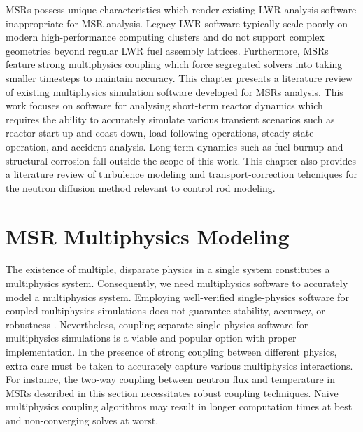 \glspl{MSR} possess unique characteristics which render existing \gls{LWR}
analysis software inappropriate for \gls{MSR} analysis. Legacy \gls{LWR}
software typically scale poorly on modern high-performance computing
clusters and do not support complex geometries beyond regular \gls{LWR} fuel
assembly lattices. Furthermore, \glspl{MSR} feature strong multiphysics
coupling which force segregated solvers into taking smaller timesteps to
maintain accuracy. This chapter presents a literature
review of existing multiphysics simulation software developed for \glspl{MSR}
analysis. This work focuses on software for analysing short-term reactor
dynamics which requires the ability to accurately simulate various transient
scenarios such as reactor start-up and coast-down, load-following operations,
steady-state operation, and accident analysis. Long-term dynamics such as fuel
burnup and structural corrosion fall outside the scope of this work.
This chapter also provides a literature review of turbulence modeling and transport-correction
tehcniques for the neutron diffusion method relevant to control rod modeling.

\section{MSR Multiphysics Modeling} \label{sec:msr-multiphysics}

The existence of multiple, disparate physics in a single system constitutes a multiphysics system.
Consequently, we need multiphysics software to accurately model a multiphysics system. Employing
well-verified single-physics software for coupled multiphysics simulations does not guarantee
stability, accuracy, or robustness \cite{keyes_multiphysics_2013}. Nevertheless, coupling separate
single-physics software for multiphysics simulations is a viable and popular option with proper
implementation. In the presence of strong coupling between different physics, extra care must be
taken to accurately capture various multiphysics interactions. For instance, the two-way coupling
between neutron flux and temperature in \glspl{MSR} described in this section necessitates robust
coupling techniques. Naive multiphysics coupling algorithms may result in longer computation times
at best and non-converging solves at worst.

